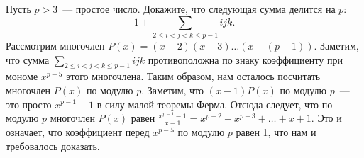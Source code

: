 \problem{}
Пусть $p > 3$~--- простое число.
Докажите, что следующая сумма делится на $p$:
\[
    1 +
    \sum_{2 \leq i < j < k \leq p-1}
        i j k
.\]
\solution
Рассмотрим многочлен $P(x) = (x - 2) (x - 3) \ldots (x - (p - 1))$.
Заметим, что сумма
\(
    \sum_{2 \leq i < j < k \leq p-1}
        i j k
\)
противоположна по знаку коэффициенту при мономе $x^{p-5}$ этого многочлена.
Таким образом, нам осталось посчитать многочлен $P(x)$ по модулю $p$.
Заметим, что $(x - 1) P(x)$ по модулю $p$~--- это просто $x^{p-1} - 1$ в силу малой
теоремы Ферма.
Отсюда следует, что по модулю $p$ многочлен $P(x)$ равен
$\frac{x^{p-1} - 1}{x - 1} = x^{p-2} + x^{p-3} + \ldots + x + 1$.
Это и означает, что коэффициент перед $x^{p-5}$ по модулю $p$ равен 1, что нам и
требовалось доказать.
\endproblem
